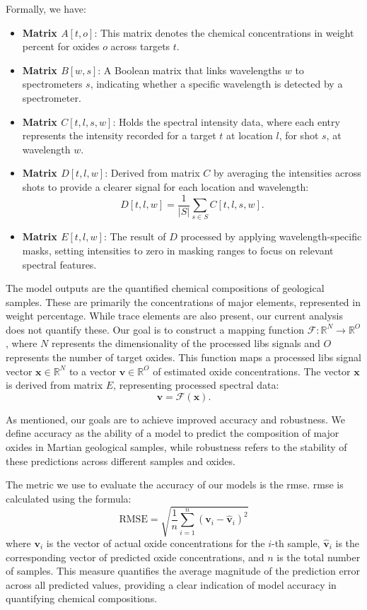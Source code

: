 Formally, we have:

\begin{itemize}
    \item \textbf{Matrix $A[t, o]$}: This matrix denotes the chemical concentrations in weight percent for oxides $o$ across targets $t$.
    \item \textbf{Matrix $B[w, s]$}: A Boolean matrix that links wavelengths $w$ to spectrometers $s$, indicating whether a specific wavelength is detected by a spectrometer.
    \item \textbf{Matrix $C[t, l, s, w]$}: Holds the spectral intensity data, where each entry represents the intensity recorded for a target $t$ at location $l$, for shot $s$, at wavelength $w$.
    \item \textbf{Matrix $D[t, l, w]$}: Derived from matrix $C$ by averaging the intensities across shots to provide a clearer signal for each location and wavelength:
    \[
    D[t, l, w] = \frac{1}{|S|} \sum_{s \in S} C[t, l, s, w].
    \]
    \item \textbf{Matrix $E[t, l, w]$}: The result of $D$ processed by applying wavelength-specific masks, setting intensities to zero in masking ranges to focus on relevant spectral features.
\end{itemize}

The model outputs are the quantified chemical compositions of geological samples. These are primarily the concentrations of major elements, represented in weight percentage. While trace elements are also present, our current analysis does not quantify these.
Our goal is to construct a mapping function $\mathcal{F}: \mathbb{R}^N \rightarrow \mathbb{R}^O$, where $N$ represents the dimensionality of the processed \gls{libs} signals and $O$ represents the number of target oxides. This function maps a processed \gls{libs} signal vector $\mathbf{x} \in \mathbb{R}^N$ to a vector $\mathbf{v} \in \mathbb{R}^O$ of estimated oxide concentrations. The vector $\mathbf{x}$ is derived from matrix $E$, representing processed spectral data:
\[
\mathbf{v} = \mathcal{F}(\mathbf{x}).
\]

As mentioned, our goals are to achieve improved accuracy and robustness.
We define accuracy as the ability of a model to predict the composition of major oxides in Martian geological samples, while robustness refers to the stability of these predictions across different samples and oxides.

The metric we use to evaluate the accuracy of our models is the \gls{rmse}. \gls{rmse} is calculated using the formula:
\[
\text{RMSE} = \sqrt{\frac{1}{n} \sum_{i=1}^{n} (\mathbf{v}_i - \hat{\mathbf{v}}_i)^2}
\]
where \( \mathbf{v}_i \) is the vector of actual oxide concentrations for the \( i \)-th sample, \( \hat{\mathbf{v}}_i \) is the corresponding vector of predicted oxide concentrations, and \( n \) is the total number of samples. This measure quantifies the average magnitude of the prediction error across all predicted values, providing a clear indication of model accuracy in quantifying chemical compositions.

